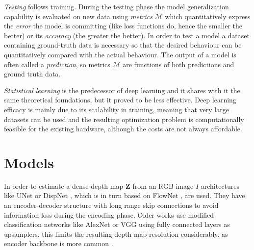 \textit{Testing} follows training.
During the testing phase the model generalization capability is evaluated on new data using \textit{metrics} $\mathcal{M}$ which quantitatively express the \textit{error} the model is committing (like loss functions do, hence the smaller the better) or its \textit{accuracy} (the greater the better).
In order to test a model a dataset containing ground-truth data is necessary so that the desired behaviour can be quantitatively compared with the actual behaviour.
The output of a model is often called a \textit{prediction}, so metrics $\mathcal{M}$ are functions of both predictions and ground truth data.


\textit{Statistical learning} is the predecessor of deep learning and it shares with it the same theoretical foundations, but it proved to be less effective.
Deep learning efficacy is mainly due to its scalability in training, meaning that very large datasets can be used and the resulting optimization problem is computationally feasible for the existing hardware, although the costs are not always affordable.

%
%
%


\section{Models}
In order to estimate a dense depth map $\mathbf{Z}$ from an RGB image $I$ architectures like UNet \cite{UNet} or DispNet \cite{DispNet}, which is in turn based on FlowNet \cite{FlowNet}, are used.
They have an encoder-decoder structure with long range skip connections to avoid information loss during the encoding phase. 
Older works \cite{Eigen} \cite{Eigen2} use modified classification networks like AlexNet \cite{AlexNet} or VGG \cite{VGG} using fully connected layers as upsamplers, this limits the resulting depth map resolution considerably.
\cite{ResNet} as encoder backbone is more common \cite{MonoDepth2}.

